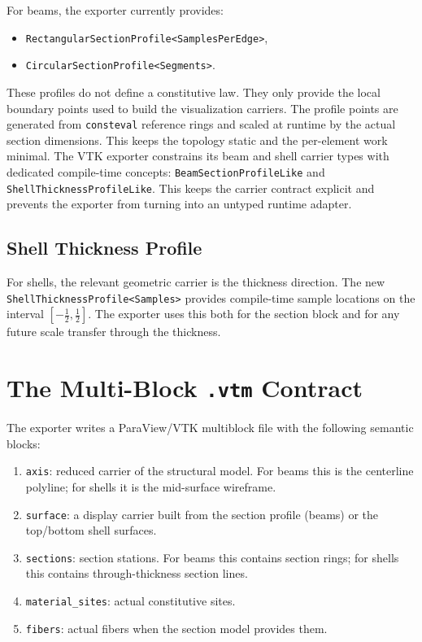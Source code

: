 For beams, the exporter currently provides:
\begin{itemize}
  \item \texttt{RectangularSectionProfile<SamplesPerEdge>},
  \item \texttt{CircularSectionProfile<Segments>}.
\end{itemize}

These profiles do not define a constitutive law.  They only provide the local
boundary points used to build the visualization carriers.  The profile points
are generated from \texttt{consteval} reference rings and scaled at runtime by
the actual section dimensions.  This keeps the topology static and the
per-element work minimal.  The VTK exporter constrains its beam and shell
carrier types with dedicated compile-time concepts:
\texttt{BeamSectionProfileLike} and \texttt{ShellThicknessProfileLike}.  This
keeps the carrier contract explicit and prevents the exporter from turning into
an untyped runtime adapter.

\subsection{Shell Thickness Profile}

For shells, the relevant geometric carrier is the thickness direction.  The
new \texttt{ShellThicknessProfile<Samples>} provides compile-time sample
locations on the interval $[-\tfrac12,\tfrac12]$.  The exporter uses this both
for the section block and for any future scale transfer through the thickness.

\section{The Multi-Block \texttt{.vtm} Contract}

The exporter writes a ParaView/VTK multiblock file with the following semantic
blocks:
\begin{enumerate}
  \item \texttt{axis}: reduced carrier of the structural model.
        For beams this is the centerline polyline; for shells it is the
        mid-surface wireframe.
  \item \texttt{surface}: a display carrier built from the section profile
        (beams) or the top/bottom shell surfaces.
  \item \texttt{sections}: section stations.  For beams this contains section
        rings; for shells this contains through-thickness section lines.
  \item \texttt{material\_sites}: actual constitutive sites.
  \item \texttt{fibers}: actual fibers when the section model provides them.
\end{enumerate}

